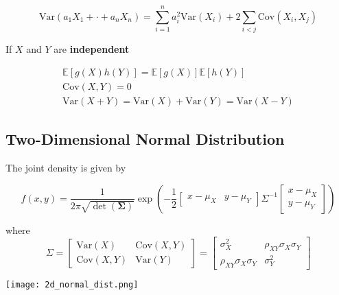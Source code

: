 \newpar{}

\begin{equation*}
    \mathrm{Var}(a_1 X_1+\cdot+a_n X_n) = \sum_{i=1}^{n}a_i^2\mathrm{Var}(X_i)+2\sum_{i<j}\mathrm{Cov}(X_i,X_j)
\end{equation*}

If $X$ and $Y$ are \textbf{independent}

\begin{gather*}
    \mathbb{E}[g(X)h(Y)] = \mathbb{E}[g(X)]\mathbb{E}[h(Y)] \\
    \mathrm{Cov}(X,Y) = 0 \\
    \mathrm{Var}(X+Y) = \mathrm{Var}(X) + \mathrm{Var}(Y) = \mathrm{Var}(X-Y)
\end{gather*}


\subsection{Two-Dimensional Normal Distribution}

The joint density is given by
\begin{footnotesize}
    \begin{equation*}
        f(x,y) = \frac{1}{2\pi\sqrt{\det(\bm{\Sigma})}}\exp\left(-\frac{1}{2}\begin{bmatrix}x-\mu_X & y-\mu_Y\end{bmatrix}\Sigma^{-1}\begin{bmatrix}x-\mu_X \\ y-\mu_Y \end{bmatrix}\right)
    \end{equation*}
\end{footnotesize}
where
\begin{equation*}
    \Sigma = \begin{bmatrix}
        \mathrm{Var}(X)   & \mathrm{Cov}(X,Y) \\
        \mathrm{Cov}(X,Y) & \mathrm{Var}(Y)
    \end{bmatrix}
    =
    \begin{bmatrix}
        \sigma_X^2                & \rho_{XY}\sigma_X\sigma_Y \\
        \rho_{XY}\sigma_X\sigma_Y & \sigma_Y^2
    \end{bmatrix}
\end{equation*}

\begin{center}
    \texttt{[image: 2d\_normal\_dist.png]}
\end{center}

